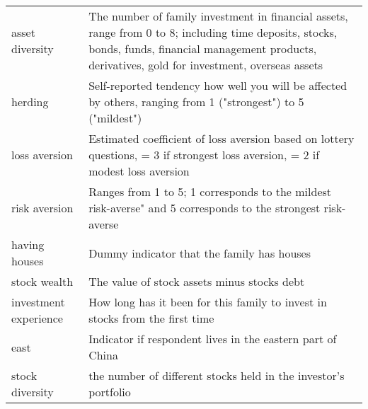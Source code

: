 \documentclass[ukenglish,nottitlepage,thmsb,11pt,letterpaper]{article}
\begin{document}
\begin{spacing}{1}
\begin{table}[H]
\begin{tabular}{L{4.25cm}L{12.25cm}}
		asset diversity   & The number of family investment in financial assets, range from 0 to 8; including time deposits, stocks, bonds, funds, financial management products, derivatives, gold for investment, overseas assets  \\
		herding   & Self-reported tendency how well you will be affected by others, ranging from 1 ("strongest") to 5 ("mildest") \\
		loss aversion  & Estimated coefficient of loss aversion based on lottery questions, = 3 if strongest loss aversion, = 2 if modest loss aversion  \\
		risk aversion   & Ranges from 1 to 5; 1 corresponds to the mildest risk-averse" and 5 corresponds to the strongest risk-averse \\
		having houses    &  Dummy indicator that the family has houses  \\
		stock wealth     &  The value of stock assets minus stocks debt \\
		investment experience  &   How long has it been for this family to invest in stocks from the first time \\
		east    &Indicator if respondent lives in the eastern part of China \\
		stock diversity  & the number of different stocks held in the investor’s portfolio  \\
		\bottomrule
	\end{tabular}%
\end{table}%
\end{spacing}
\end{document}
